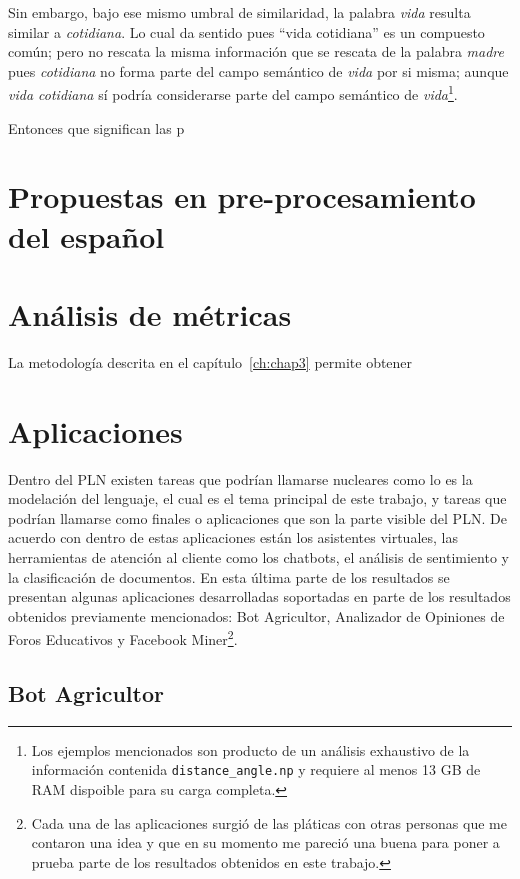 Sin embargo, bajo ese mismo umbral de similaridad, la palabra \textit{vida} resulta similar a \textit{cotidiana}. Lo cual da sentido pues ``vida cotidiana'' es un compuesto común; pero no rescata la misma información que se rescata de la palabra \textit{madre} pues \textit{cotidiana} no forma parte del campo semántico de \textit{vida} por si misma; aunque \textit{vida cotidiana} sí podría considerarse parte del campo semántico de \textit{vida}\footnote{Los ejemplos mencionados son producto de un análisis exhaustivo de la información contenida \texttt{distance\_angle.np} y requiere al menos 13 GB de RAM dispoible para su carga completa.}.

Entonces que significan las p

\section{Propuestas en pre-procesamiento del español}


\section{Análisis de métricas}

La metodología descrita en el capítulo~\ref{ch:chap3} permite obtener 

\section{Aplicaciones}

Dentro del PLN existen tareas que podrían llamarse nucleares como lo es la modelación del lenguaje, el cual es el tema principal de este trabajo, y tareas que podrían llamarse como finales o aplicaciones que son la parte visible del PLN. De acuerdo con \cite{srinivasa2018natural} dentro de estas aplicaciones están los asistentes virtuales, las herramientas de atención al cliente como los chatbots, el análisis de sentimiento y la clasificación de documentos. En esta última parte de los resultados se presentan algunas aplicaciones desarrolladas soportadas en parte de los resultados obtenidos previamente mencionados: Bot Agricultor, Analizador de Opiniones de Foros Educativos y Facebook Miner\footnote{Cada una de las aplicaciones surgió de las pláticas con otras personas que me contaron una idea y que en su momento me pareció una buena para poner a prueba parte de los resultados obtenidos en este trabajo.}. 

\subsection{Bot Agricultor}

